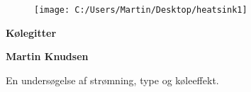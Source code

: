 
	\begin{center}
	
		
		\begin{figure}
			\centering
			\texttt{[image: C:/Users/Martin/Desktop/heatsink1]}
			
			
		\end{figure}
		\vspace*{1cm}
		
			\vspace*{1cm}
		
		\textbf{Kølegitter}
		
		\textbf{Martin Knudsen}
		
		\vfill
		
		En undersøgelse af strømning, type og køleeffekt. 
		
		\vspace{2.0cm}
	\end{center}










